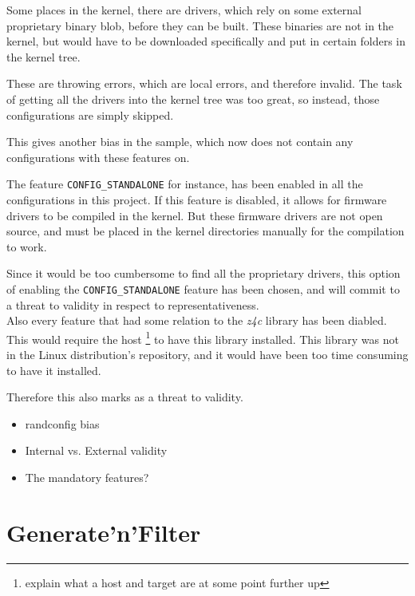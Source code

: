 \documentclass[a4paper,11pt]{report}
\newcommand{\textcode}[1]{
    \fboxsep=1pt
    \texttt{\colorbox{gray!20}{#1}}
}
\begin{document}
Some places in the kernel, there are drivers, which rely on some external 
proprietary binary blob, before they can be built. These binaries are not in 
the kernel, but would have to be downloaded specifically and put in certain 
folders in the kernel tree.

These are throwing errors, which are local errors, and therefore invalid. The 
task of getting all the drivers into the kernel tree was too great, so instead, 
those configurations are simply skipped.

This gives another bias in the sample, which now does not contain any 
configurations with these features on.


The feature \textcode{CONFIG\_STANDALONE} for instance, has been enabled in all 
the configurations in this project. If this feature is disabled, it allows for 
firmware drivers to be compiled in the kernel. But these firmware drivers are 
not open source, and must be placed in the kernel directories manually for the 
compilation to work.

Since it would be too cumbersome to find all the proprietary drivers, this 
option of enabling the \textcode{CONFIG\_STANDALONE} feature has been chosen, 
and will commit to a threat to validity in respect to representativeness.
\\

Also every feature that had some relation to the \emph{z4c} library has been 
diabled. This would require the host \footnote{explain what a host and target 
are at some point further up} to have this library installed. This library was 
not in the Linux distribution's repository, and it would have been too time 
consuming to have it installed. 

Therefore this also marks as a threat to validity.

\begin{itemize}
    \item randconfig bias
    \item Internal vs. External validity
    \item The mandatory features?
\end{itemize}

\section{Generate'n'Filter}
\end{document}
